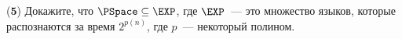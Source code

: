 ($\mathbf{5}$)
Докажите, что $\PSpace \subseteq \EXP$, где $\EXP$~--- это множество языков, которые распознаются за время $2^{p(n)}$, где
$p$~--- некоторый полином.
